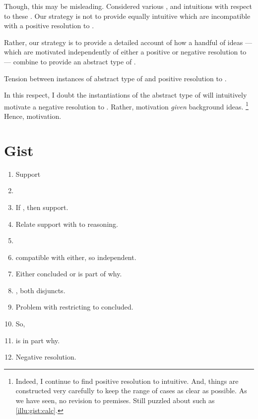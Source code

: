 \begin{note}
  Though, this may be misleading.
  Considered various , and intuitions with respect to these .
  Our strategy is not to provide equally intuitive  which are incompatible with a positive resolution to \issueConstraint{}.

  Rather, our strategy is to provide a detailed account of how a handful of ideas --- which are motivated independently of either a positive or negative resolution to  \issueConstraint{} --- combine to provide an abstract type of .

  Tension between instances of abstract type of  and positive resolution to \issueConstraint{}.

  In this respect, I doubt the instantiations of the abstract type of  will intuitively motivate a negative resolution to \issueConstraint{}.
  Rather, motivation \emph{given} background ideas.%
  \footnote{
    Indeed, I continue to find positive resolution to \issueConstraint{} intuitive.
    And, things are constructed very carefully to keep the range of cases as clear as possible.
    As we have seen, no revision to premises.
    Still puzzled about  such as \autoref{illu:gist:calc}.
  }
  Hence, motivation.
\end{note}

\section{Gist}

\begin{note}
  \begin{enumerate}
  \item
    Support
  \item
  \item
    If , then support.
  \item
    Relate support with  to reasoning.
  \item
    \zS{}
  \item
    \zS{} compatible with either, so independent.
  \item
    Either concluded or  is part of why.
  \item
    , both disjuncts.
  \item
    Problem with restricting to concluded.
  \item
    So, 
  \item
     is in part why.
  \item
    Negative resolution.
  \end{enumerate}
\end{note}

